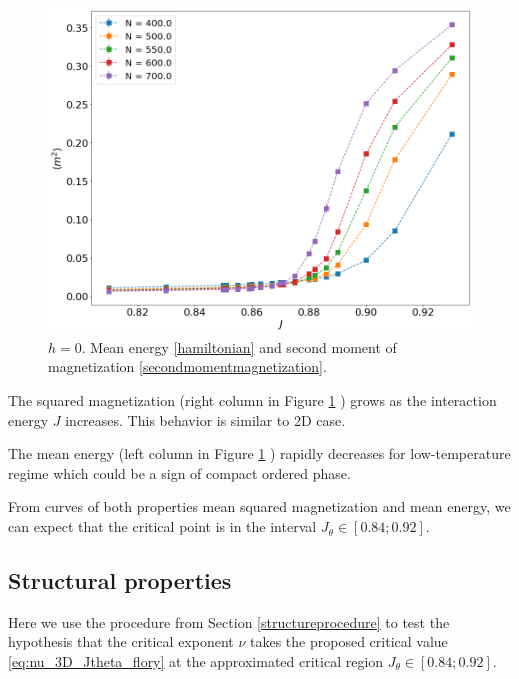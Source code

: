\begin{figure}
	\includegraphics[scale=0.23]{Images/3_magnetization2_longchains.png}
	\caption{$h=0$. Mean energy \eqref{hamiltonian} and   second moment of magnetization \eqref{secondmomentmagnetization}. }
	\label{fig:energymagshort_3D}
\end{figure}

The squared magnetization (right column in Figure \ref{fig:energymagshort_3D} ) grows as the interaction energy $J$ increases. This behavior is similar to 2D case. 

The mean energy (left column in Figure \ref{fig:energymagshort_3D} )  rapidly decreases for low-temperature regime which could be a sign of compact ordered phase. 

From curves of both properties mean squared magnetization and mean energy, we can expect that the critical point is in the interval $J_{\theta} \in [0.84; 0.92]$.

\subsection{Structural properties}

Here we use the procedure from Section \ref{structureprocedure} to test the hypothesis that the critical exponent $\nu$ takes the proposed critical value \eqref{eq:nu_3D_Jtheta_flory} at the approximated critical region $J_{\theta} \in [0.84; 0.92]$. 

